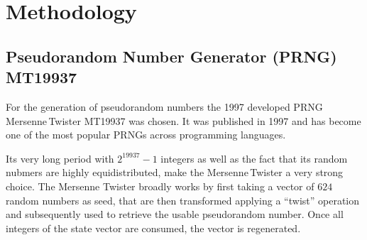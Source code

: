\section{Methodology}

\subsection{Pseudorandom Number Generator (PRNG) MT19937}\label{ssec:methodology_rng_mt19937}

For the generation of pseudorandom numbers the 1997 developed PRNG Mer\-sen\-ne\,Twis\-ter MT19937\cite{Makoto_Takuji} was chosen. 
It was published in 1997 and has become one of the most popular PRNGs across programming languages.\cite{educativeMersenneTwister}

Its very long period with $2^{19937}-1$ integers as well as the fact that its random nubmers are highly equidistributed\cite{MT_LearnCPP}, make the Mer\-sen\-ne\,Twis\-ter a very strong choice.
The Mersenne Twister broadly works by first taking a vector of $624$ random numbers as seed, that are then transformed applying a ``twist'' operation and subsequently used to retrieve the usable pseudorandom number. 
Once all integers of the state vector are consumed, the vector is regenerated.\cite{educativeMersenneTwister}\cite{MT_DavidWong}
